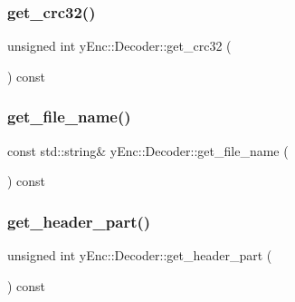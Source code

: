 \hypertarget{classy_enc_1_1_decoder_aa93a059f7eb8418dcb93f2f65ba86278}{}\label{classy_enc_1_1_decoder_aa93a059f7eb8418dcb93f2f65ba86278} 
\subsubsection{\texorpdfstring{get\+\_\+crc32()}{get\_crc32()}}
{\footnotesize\ttfamily unsigned int y\+Enc\+::\+Decoder\+::get\+\_\+crc32 (\begin{DoxyParamCaption}{ }\end{DoxyParamCaption}) const\hspace{0.3cm}{\ttfamily [inline]}}

\hypertarget{classy_enc_1_1_decoder_a1a1c8d5184b9984138662e0bc2ce6bd3}{}\label{classy_enc_1_1_decoder_a1a1c8d5184b9984138662e0bc2ce6bd3} 
\subsubsection{\texorpdfstring{get\+\_\+file\+\_\+name()}{get\_file\_name()}}
{\footnotesize\ttfamily const std\+::string\& y\+Enc\+::\+Decoder\+::get\+\_\+file\+\_\+name (\begin{DoxyParamCaption}{ }\end{DoxyParamCaption}) const\hspace{0.3cm}{\ttfamily [inline]}}

\hypertarget{classy_enc_1_1_decoder_a50992c8804460d064168ec05c8beb661}{}\label{classy_enc_1_1_decoder_a50992c8804460d064168ec05c8beb661} 
\subsubsection{\texorpdfstring{get\+\_\+header\+\_\+part()}{get\_header\_part()}}
{\footnotesize\ttfamily unsigned int y\+Enc\+::\+Decoder\+::get\+\_\+header\+\_\+part (\begin{DoxyParamCaption}{ }\end{DoxyParamCaption}) const\hspace{0.3cm}{\ttfamily [inline]}}

